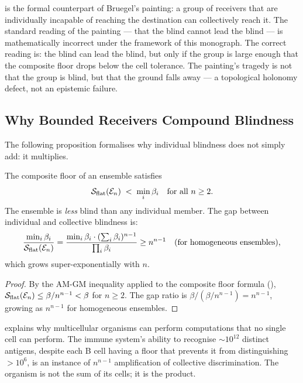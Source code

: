 \begin{remark}
 is the formal counterpart of Bruegel's
painting: a group of receivers that are individually incapable of reaching
the destination can collectively reach it.  The standard reading of the
painting — that the blind cannot lead the blind — is mathematically incorrect
under the framework of this monograph.  The correct reading is: the blind
can lead the blind, but only if the group is large enough that the composite
floor drops below the cell tolerance.  The painting's tragedy is not that
the group is blind, but that the ground falls away — a topological holonomy
defect, not an epistemic failure.
\end{remark}

\subsection{Why Bounded Receivers Compound Blindness}

The following proposition formalises why individual blindness does not simply
add: it multiplies.

\begin{proposition}
\label{prop:multiplicative-compounding}
The composite floor of an ensemble satisfies
\[
  \mathcal{S}_{\mathrm{flat}}(\mathcal{E}_n) \;<\; \min_i \beta_i
  \quad \text{for all } n \geq 2.
\]
The ensemble is \emph{less} blind than any individual member.
The gap between individual and collective blindness is:
\[
  \frac{\min_i \beta_i}{\mathcal{S}_{\mathrm{flat}}(\mathcal{E}_n)}
  = \frac{\min_i \beta_i \cdot (\sum_i \beta_i)^{n-1}}{\prod_i \beta_i}
  \geq n^{n-1}
  \quad \text{(for homogeneous ensembles),}
\]
which grows super-exponentially with $n$.
\end{proposition}

\begin{proof}
By the AM-GM inequality applied to the composite floor formula
(), $\mathcal{S}_{\mathrm{flat}}(\mathcal{E}_n) \leq \beta/n^{n-1}
< \beta$ for $n \geq 2$.  The gap ratio is $\beta / (\beta/n^{n-1}) = n^{n-1}$,
growing as $n^{n-1}$ for homogeneous ensembles.
\end{proof}

\begin{remark}
 explains why multicellular organisms
can perform computations that no single cell can perform.  The immune system's
ability to recognise $\sim 10^{12}$ distinct antigens, despite each B cell
having a floor that prevents it from distinguishing $> 10^6$, is an
instance of $n^{n-1}$ amplification of collective discrimination.  The
organism is not the sum of its cells; it is the product.
\end{remark}


